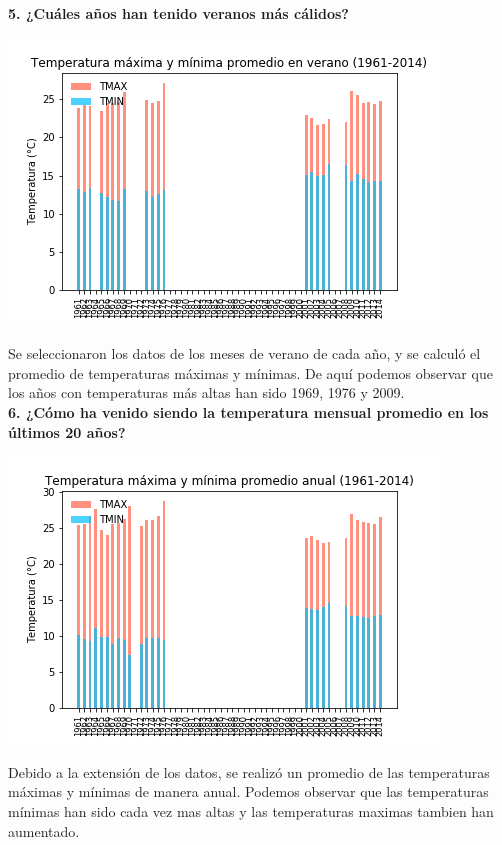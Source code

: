 \documentclass[12pt]{article}
\begin{document}
\noindent\textbf {5. ¿Cuáles años han tenido veranos más cálidos?} \\
\begin{center}
\includegraphics[scale=0.65]{Temperaturasprom_verano.png}
\end{center} Se seleccionaron los datos de los meses de verano de cada año, y se calculó el promedio de temperaturas máximas y mínimas.
De aquí podemos observar que los años con temperaturas más altas han sido 1969, 1976 y 2009. \\


\noindent\textbf {6. ¿Cómo ha venido siendo la temperatura mensual promedio en los últimos 20 años?} \\
\begin{center}
\includegraphics[scale=0.65]{Temperaturasprom_anual.png}
\end{center} Debido a la extensión de los datos, se realizó un promedio de las temperaturas máximas y mínimas de manera anual. Podemos observar que las temperaturas mínimas han sido cada vez mas altas y las temperaturas maximas tambien han aumentado.
\end{document}
